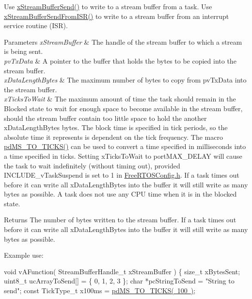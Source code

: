 \begin{DoxyPre}
\begin{DoxyPre}   Use \mbox{\hyperlink{stream__buffer_8h_a35cdf3b6bf677086b9128782f762499d}{xStreamBufferSend()}} to write to a stream buffer from a task.  Use
   \mbox{\hyperlink{stream__buffer_8h_a1dab226e99230e01e79bc2b5c0605e44}{xStreamBufferSendFromISR()}} to write to a stream buffer from an interrupt
   service routine (ISR).\end{DoxyPre}
\end{DoxyPre}



\begin{DoxyPre}
\begin{DoxyPre}
\begin{DoxyParams}{Parameters}
{\em xStreamBuffer} & The handle of the stream buffer to which a stream is
   being sent.\\
\hline
{\em pvTxData} & A pointer to the buffer that holds the bytes to be copied
   into the stream buffer.\\
\hline
{\em xDataLengthBytes} & The maximum number of bytes to copy from pvTxData
   into the stream buffer.\\
\hline
{\em xTicksToWait} & The maximum amount of time the task should remain in the
   Blocked state to wait for enough space to become available in the stream
   buffer, should the stream buffer contain too little space to hold the
   another xDataLengthBytes bytes.  The block time is specified in tick periods,
   so the absolute time it represents is dependent on the tick frequency.  The
   macro \mbox{\hyperlink{projdefs_8h_a353d0f62b82a402cb3db63706c81ec3f}{pdMS\_TO\_TICKS()}} can be used to convert a time specified in milliseconds
   into a time specified in ticks.  Setting xTicksToWait to portMAX\_DELAY will
   cause the task to wait indefinitely (without timing out), provided
   INCLUDE\_vTaskSuspend is set to 1 in \mbox{\hyperlink{_free_r_t_o_s_config_8h}{FreeRTOSConfig.h}}.  If a task times out
   before it can write all xDataLengthBytes into the buffer it will still write
   as many bytes as possible.  A task does not use any CPU time when it is in
   the blocked state.\\
\hline
\end{DoxyParams}
\begin{DoxyReturn}{Returns}
The number of bytes written to the stream buffer.  If a task times
   out before it can write all xDataLengthBytes into the buffer it will still
   write as many bytes as possible.
\end{DoxyReturn}
Example use:

\begin{DoxyPre}
void vAFunction( StreamBufferHandle\_t xStreamBuffer )
\{
size\_t xBytesSent;
uint8\_t ucArrayToSend[] = \{ 0, 1, 2, 3 \};
char *pcStringToSend = "String to send";
const TickType\_t x100ms = \mbox{\hyperlink{projdefs_8h_a353d0f62b82a402cb3db63706c81ec3f}{pdMS\_TO\_TICKS( 100 )}};\end{DoxyPre}
\end{DoxyPre}
\end{DoxyPre}



